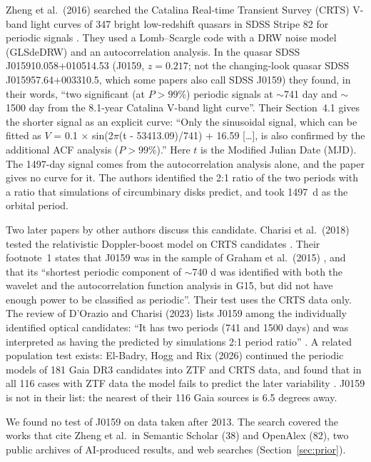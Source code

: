 \documentclass[11pt]{article}
\begin{document}
Zheng et al.\ (2016) searched the Catalina Real-time Transient Survey (CRTS) \cite{drake2009} V-band light curves of 347 bright low-redshift quasars in SDSS Stripe 82 for periodic signals \cite{zheng2016}. They used a Lomb--Scargle code with a DRW noise model (GLSdeDRW) and an autocorrelation analysis. In the quasar SDSS J015910.058+010514.53 (J0159, $z = 0.217$; not the changing-look quasar SDSS J015957.64+003310.5, which some papers also call SDSS J0159) they found, in their words, ``two significant (at $P>99\%$) periodic signals at $\sim$741 day and $\sim$1500 day from the 8.1-year Catalina V-band light curve''. Their Section~4.1 gives the shorter signal as an explicit curve: ``Only the sinusoidal signal, which can be fitted as $V$ = 0.1 $\times$ sin(2$\pi$(t - 53413.09)/741) + 16.59 [\dots], is also confirmed by the additional ACF analysis ($P>99\%$).'' Here $t$ is the Modified Julian Date (MJD). The 1497-day signal comes from the autocorrelation analysis alone, and the paper gives no curve for it. The authors identified the 2:1 ratio of the two periods with a ratio that simulations of circumbinary disks predict, and took 1497~d as the orbital period.

Two later papers by other authors discuss this candidate. Charisi et al.\ (2018) tested the relativistic Doppler-boost model on CRTS candidates \cite{charisi2018}. Their footnote~1 states that J0159 was in the sample of Graham et al.\ (2015) \cite{graham2015}, and that its ``shortest periodic component of $\sim$740 d was identified with both the wavelet and the autocorrelation function analysis in G15, but did not have enough power to be classified as periodic''. Their test uses the CRTS data only. The review of D'Orazio and Charisi (2023) lists J0159 among the individually identified optical candidates: ``It has two periods (741 and 1500 days) and was interpreted as having the predicted by simulations 2:1 period ratio'' \cite{dorazio2023}. A related population test exists: El-Badry, Hogg and Rix (2026) continued the periodic models of 181 Gaia DR3 candidates into ZTF and CRTS data, and found that in all 116 cases with ZTF data the model fails to predict the later variability \cite{elbadry2026}. J0159 is not in their list: the nearest of their 116 Gaia sources is 6.5 degrees away.

We found no test of J0159 on data taken after 2013. The search covered the works that cite Zheng et al.\ in Semantic Scholar (38) and OpenAlex (82), two public archives of AI-produced results, and web searches (Section~\ref{sec:prior}).
\end{document}
